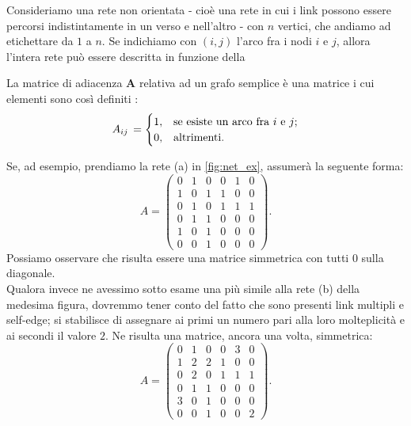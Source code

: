 Consideriamo una rete non orientata - cioè una rete in cui i link possono essere percorsi indistintamente in un verso e nell'altro - con $ n $ vertici, che andiamo ad etichettare da $ 1 $ a $ n $. Se indichiamo con $ \left( i, j \right) $ l'arco fra i nodi $ i $ e $ j $, allora l'intera rete può essere descritta in funzione della
\begin{definizione}
La matrice di adiacenza \textbf{A} relativa ad un grafo semplice è una matrice i cui elementi sono così definiti \cite{Newman}:
\[
A_{ij} \, =
\begin{cases}
1, & \text{se esiste un arco fra $ i $ e $ j $};\\ 
0, & \text{altrimenti}.
\end{cases}
\]
\end{definizione}
Se, ad esempio, prendiamo la rete (a) in \cref{fig:net_ex}, assumerà la seguente forma:
\begin{equation}
A =
\begin{pmatrix}
0 & 1 & 0 & 0 & 1 & 0 \\
1 & 0 & 1 & 1 & 0 & 0 \\
0 & 1 & 0 & 1 & 1 & 1 \\
0 & 1 & 1 & 0 & 0 & 0 \\
1 & 0 & 1 & 0 & 0 & 0 \\
0 & 0 & 1 & 0 & 0 & 0
\end{pmatrix} .
\end{equation}
Possiamo osservare che risulta essere una matrice simmetrica con tutti $ 0 $ sulla diagonale. 
\\Qualora invece ne avessimo sotto esame una più simile alla rete (b) della medesima figura, dovremmo tener conto del fatto che sono presenti link multipli e self-edge; si stabilisce di assegnare ai primi un numero pari alla loro molteplicità e ai secondi il valore $ 2 $. Ne risulta una matrice, ancora una volta, simmetrica:
\begin{equation}
A =
\begin{pmatrix}
0 & 1 & 0 & 0 & 3 & 0 \\
1 & 2 & 2 & 1 & 0 & 0 \\
0 & 2 & 0 & 1 & 1 & 1 \\
0 & 1 & 1 & 0 & 0 & 0 \\
3 & 0 & 1 & 0 & 0 & 0 \\
0 & 0 & 1 & 0 & 0 & 2
\end{pmatrix} .
\end{equation}

